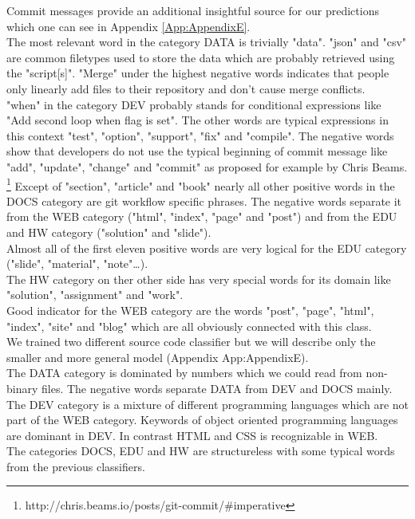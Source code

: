 \documentclass[%
a4paper,
DIV12,
2.5headlines,
bigheadings,
titlepage,
openbib,
]{scrartcl}
\begin{document}
Commit messages provide an additional insightful source for our predictions which one can see in Appendix \ref{App:AppendixE}.\\
The most relevant word in the category DATA is trivially "data".
"json" and "csv" are common filetypes used to store the data which are probably retrieved using the "script[s]".
"Merge" under the highest negative words indicates that people only linearly add files to their repository and don't cause merge conflicts.\\
"when" in the category DEV probably stands for conditional expressions like "Add second loop when flag is set".
The other words are typical expressions in this context "test", "option", "support", "fix" and "compile".
The negative words show that developers do not use the typical beginning of commit message like "add", "update", "change" and "commit" as proposed for example by Chris Beams.\\ \footnote{http://chris.beams.io/posts/git-commit/\#imperative}
Except of "section", "article" and "book" nearly all other positive words in the DOCS category are git workflow specific phrases.
The negative words separate it from the WEB category ("html", "index", "page" and "post") and from the EDU and HW category ("solution" and "slide").\\
Almost all of the first eleven positive words are very logical for the EDU category ("slide", "material", "note"\dots).\\
The HW category on ther other side has very special words for its domain like "solution", "assignment" and "work".\\
Good indicator for the WEB category are the words "post", "page", "html", "index", "site" and "blog" which are all obviously connected with this class.\\

We trained two different source code classifier but we will describe only the smaller and more general model (Appendix App:AppendixE).\\
The DATA category is dominated by numbers which we could read from non-binary files.
The negative words separate DATA from DEV and DOCS mainly.\\
The DEV category is a mixture of different programming languages which are not part of the WEB category.
Keywords of object oriented programming languages are dominant in DEV.
In contrast HTML and CSS is recognizable in WEB.\\
The categories DOCS, EDU and HW are structureless with some typical words from the previous classifiers.
\end{document}
